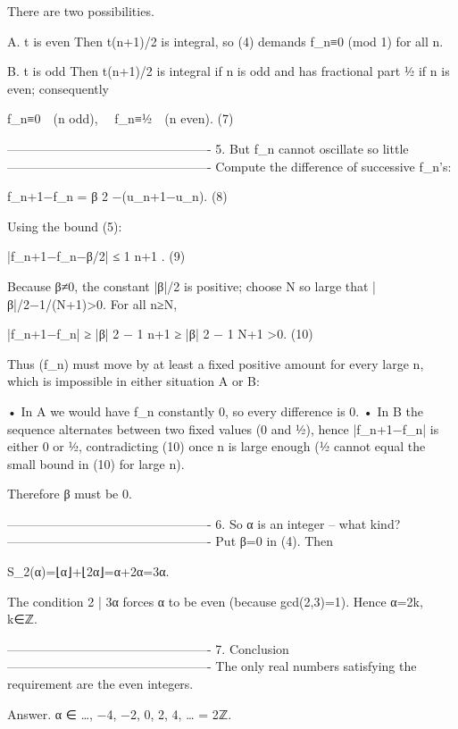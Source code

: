 There are two possibilities.

A.  t is even  
Then t(n+1)/2 is integral, so (4) demands f_n≡0 (mod 1) for all n.

B.  t is odd  
Then t(n+1)/2 is integral if n is odd and has fractional part ½ if n
is even; consequently

    f_n≡0 (n odd),  f_n≡½ (n even).        (7)

-------------------------------------------------
5.  But f_n cannot oscillate so little
-------------------------------------------------
Compute the difference of successive f_n’s:

f_{n+1}−f_n = β 2 −(u_{n+1}−u_n).             (8)

Using the bound (5):

|f_{n+1}−f_n−β/2| ≤ 1 n+1 .                   (9)

Because β≠0, the constant |β|/2 is positive; choose N so large that
|β|/2−1/(N+1)>0.  
For all n≥N,

|f_{n+1}−f_n| ≥ |β| 2 − 1 n+1 ≥ |β| 2 − 1 N+1 >0.             (10)

Thus (f_n) must move by at least a fixed positive amount for every large
n, which is impossible in either situation A or B:

• In A we would have f_n constantly 0, so every difference is 0.  
• In B the sequence alternates between two fixed values (0 and ½),
hence |f_{n+1}−f_n| is either 0 or ½, contradicting (10) once n is
large enough (½ cannot equal the small bound in (10) for large n).

Therefore β must be 0.

-------------------------------------------------
6.  So α is an integer – what kind?
-------------------------------------------------
Put β=0 in (4).  Then

S_2(α)=⌊α⌋+⌊2α⌋=α+2α=3α.

The condition 2 | 3α forces α to be even (because gcd(2,3)=1).  
Hence α=2k, k∈ℤ.

-------------------------------------------------
7.  Conclusion
-------------------------------------------------
The only real numbers satisfying the requirement are the even
integers.

Answer.  α ∈ {…, −4, −2, 0, 2, 4, …} = 2ℤ.